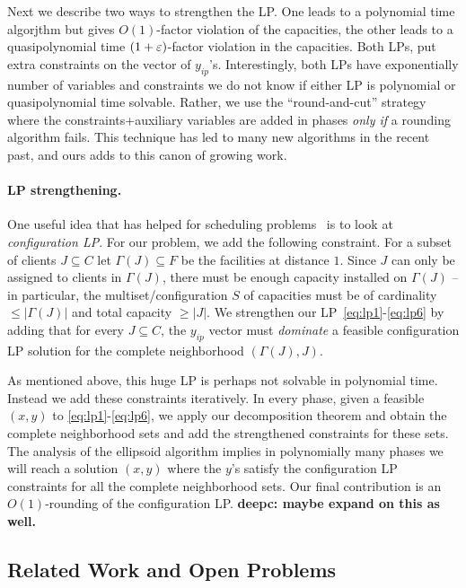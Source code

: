 \noindent
Next we describe two ways to strengthen the LP. One leads to a polynomial time algorjthm but gives $O(1)$-factor violation of the capacities, the other leads to a quasipolynomial time $(1+\varepsilon)$-factor violation in the capacities. Both LPs, put extra constraints on the vector 
of $y_{ip}$'s. Interestingly, both LPs have exponentially number of variables and constraints we do not know if either LP is polynomial or quasipolynomial time solvable. Rather, we use the ``round-and-cut'' strategy~\cite{bunch fof citations} where the constraints+auxiliary variables are added
in phases {\em only if} a rounding algorithm fails. This technique has led to many new algorithms in the recent past, and ours adds to this canon of growing work.

\paragraph{LP strengthening.} One useful idea that has helped for scheduling problems~\cite{bibid} is to look at {\em configuration LP}. For our problem, we add the following constraint. For a subset of clients $J\subseteq C$ let $\Gamma(J)\subseteq F$ 
be the facilities at distance $1$. Since $J$ can only be assigned to clients in $\Gamma(J)$, there must be enough capacity installed on $\Gamma(J)$ -- in particular, the multiset/configuration  $S$ of capacities must be of cardinality $\le |\Gamma(J)|$ and total capacity $\geq |J|$.
We strengthen our LP~\eqref{eq:lp1}-\eqref{eq:lp6} by adding that for every $J\subseteq C$, the $y_{ip}$ vector must {\em dominate} a feasible configuration LP solution for the complete neighborhood $(\Gamma(J),J)$. 

As mentioned above, this huge LP is perhaps not solvable in polynomial time. Instead we add these constraints iteratively. In every phase, given a feasible $(x,y)$ to \eqref{eq:lp1}-\eqref{eq:lp6}, we apply our decomposition theorem and obtain the complete neighborhood sets and add the strengthened constraints for these sets. The analysis of the ellipsoid algorithm implies in polynomially many phases we will reach a solution $(x,y)$ where the $y$'s satisfy the configuration LP constraints for all the complete neighborhood sets. 
Our final contribution is an $O(1)$-rounding of the configuration LP. {\bf deepc: maybe expand on this as well.}





\subsection{Related Work and Open Problems}\label{sec:related}
